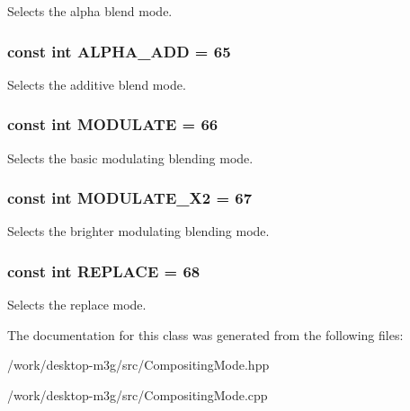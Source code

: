 Selects the alpha blend mode. \hypertarget{classm3g_1_1CompositingMode_91ac80a5450e5f7f7e382860829030d9}{
\subsubsection[{ALPHA\_\-ADD}]{\setlength{\rightskip}{0pt plus 5cm}const int {\bf ALPHA\_\-ADD} = 65}}
\label{classm3g_1_1CompositingMode_91ac80a5450e5f7f7e382860829030d9}


Selects the additive blend mode. \hypertarget{classm3g_1_1CompositingMode_96b64c2847348fb73a90c4a501cda9d1}{
\subsubsection[{MODULATE}]{\setlength{\rightskip}{0pt plus 5cm}const int {\bf MODULATE} = 66}}
\label{classm3g_1_1CompositingMode_96b64c2847348fb73a90c4a501cda9d1}


Selects the basic modulating blending mode. \hypertarget{classm3g_1_1CompositingMode_cb426684e42a5ae425989c65fbb7dbc4}{
\subsubsection[{MODULATE\_\-X2}]{\setlength{\rightskip}{0pt plus 5cm}const int {\bf MODULATE\_\-X2} = 67}}
\label{classm3g_1_1CompositingMode_cb426684e42a5ae425989c65fbb7dbc4}


Selects the brighter modulating blending mode. \hypertarget{classm3g_1_1CompositingMode_47a00ac5a59817a48db06fb2a538883c}{
\subsubsection[{REPLACE}]{\setlength{\rightskip}{0pt plus 5cm}const int {\bf REPLACE} = 68}}
\label{classm3g_1_1CompositingMode_47a00ac5a59817a48db06fb2a538883c}


Selects the replace mode. 

The documentation for this class was generated from the following files:\begin{CompactItemize}
\item 
/work/desktop-m3g/src/CompositingMode.hpp\item 
/work/desktop-m3g/src/CompositingMode.cpp\end{CompactItemize}

